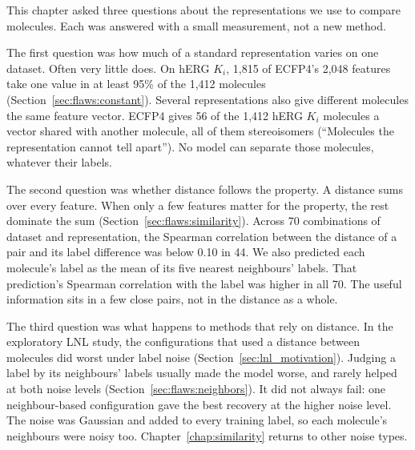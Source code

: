 This chapter asked three questions about the representations we use to compare molecules. Each was answered with a small measurement, not a new method.

The first question was how much of a standard representation varies on one dataset. Often very little does. On hERG $K_i$, 1,815 of ECFP4's 2,048 features take one value in at least 95\% of the 1,412 molecules (Section~\ref{sec:flaws:constant}). Several representations also give different molecules the same feature vector. ECFP4 gives 56 of the 1,412 hERG $K_i$ molecules a vector shared with another molecule, all of them stereoisomers (``Molecules the representation cannot tell apart''). No model can separate those molecules, whatever their labels.

The second question was whether distance follows the property. A distance sums over every feature. When only a few features matter for the property, the rest dominate the sum (Section~\ref{sec:flaws:similarity}). Across 70 combinations of dataset and representation, the Spearman correlation between the distance of a pair and its label difference was below 0.10 in 44. %
We also predicted each molecule's label as the mean of its five nearest neighbours' labels. That prediction's Spearman correlation with the label was higher in all 70. The useful information sits in a few close pairs, not in the distance as a whole.

The third question was what happens to methods that rely on distance. In the exploratory LNL study, the configurations that used a distance between molecules did worst under label noise (Section~\ref{sec:lnl_motivation}). Judging a label by its neighbours' labels usually made the model worse, and rarely helped at both noise levels (Section~\ref{sec:flaws:neighbors}). It did not always fail: one neighbour-based configuration gave the best recovery at the higher noise level. The noise was Gaussian and added to every training label, so each molecule's neighbours were noisy too. Chapter~\ref{chap:similarity} returns to other noise types.

